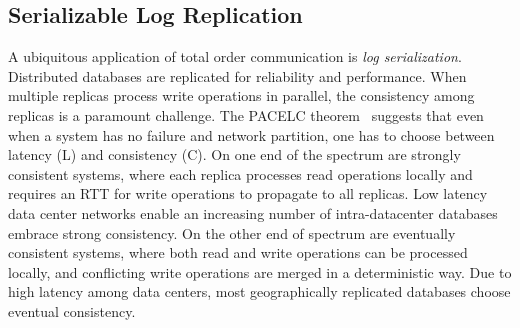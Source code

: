 


\subsection{Serializable Log Replication}
\label{subsec:log-replication}

A ubiquitous application of total order communication is \textit{log serialization}. Distributed databases are replicated for reliability and performance. When multiple replicas process write operations in parallel, the consistency among replicas is a paramount challenge. The PACELC theorem~\cite{abadi2012consistency} suggests that even when a system has no failure and network partition, one has to choose between latency (L) and consistency (C). On one end of the spectrum are strongly consistent systems, where each replica processes read operations locally and requires an RTT for write operations to propagate to all replicas. Low latency data center networks enable an increasing number of intra-datacenter databases embrace strong consistency. On the other end of spectrum are eventually consistent systems, where both read and write operations can be processed locally, and conflicting write operations are merged in a deterministic way. Due to high latency among data centers, most geographically replicated databases choose eventual consistency.

